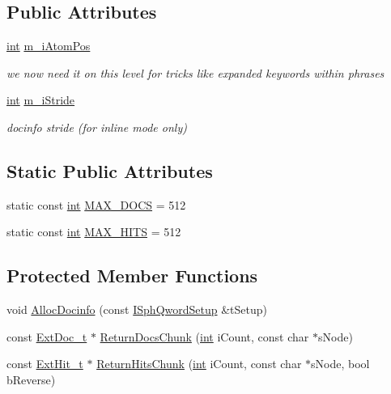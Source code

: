 \subsection*{Public Attributes}
\begin{DoxyCompactItemize}
\item 
\hyperlink{sphinxexpr_8cpp_a4a26e8f9cb8b736e0c4cbf4d16de985e}{int} \hyperlink{classExtNode__i_ac122b53fbd05eae61aa5db6399fb1aa2}{m\-\_\-i\-Atom\-Pos}
\begin{DoxyCompactList}\small\item\em we now need it on this level for tricks like expanded keywords within phrases \end{DoxyCompactList}\item 
\hyperlink{sphinxexpr_8cpp_a4a26e8f9cb8b736e0c4cbf4d16de985e}{int} \hyperlink{classExtNode__i_a8fa9b67163adbca92405ac89a39d0734}{m\-\_\-i\-Stride}
\begin{DoxyCompactList}\small\item\em docinfo stride (for inline mode only) \end{DoxyCompactList}\end{DoxyCompactItemize}
\subsection*{Static Public Attributes}
\begin{DoxyCompactItemize}
\item 
static const \hyperlink{sphinxexpr_8cpp_a4a26e8f9cb8b736e0c4cbf4d16de985e}{int} \hyperlink{classExtNode__i_afe46dd6ff6757d7a0bf3318fd1462bf9}{M\-A\-X\-\_\-\-D\-O\-C\-S} = 512
\item 
static const \hyperlink{sphinxexpr_8cpp_a4a26e8f9cb8b736e0c4cbf4d16de985e}{int} \hyperlink{classExtNode__i_a79b81cba51253fdbe56fd3595fac9ab4}{M\-A\-X\-\_\-\-H\-I\-T\-S} = 512
\end{DoxyCompactItemize}
\subsection*{Protected Member Functions}
\begin{DoxyCompactItemize}
\item 
void \hyperlink{classExtNode__i_af9495ddf4e8e288326b12ac3dd5eeb00}{Alloc\-Docinfo} (const \hyperlink{classISphQwordSetup}{I\-Sph\-Qword\-Setup} \&t\-Setup)
\item 
const \hyperlink{structExtDoc__t}{Ext\-Doc\-\_\-t} $\ast$ \hyperlink{classExtNode__i_a4fd14229ed11c37add4e746d3c85f51a}{Return\-Docs\-Chunk} (\hyperlink{sphinxexpr_8cpp_a4a26e8f9cb8b736e0c4cbf4d16de985e}{int} i\-Count, const char $\ast$s\-Node)
\item 
const \hyperlink{structExtHit__t}{Ext\-Hit\-\_\-t} $\ast$ \hyperlink{classExtNode__i_aa28f734f31c067ba5e2796fcbd2c2cb1}{Return\-Hits\-Chunk} (\hyperlink{sphinxexpr_8cpp_a4a26e8f9cb8b736e0c4cbf4d16de985e}{int} i\-Count, const char $\ast$s\-Node, bool b\-Reverse)
\end{DoxyCompactItemize}
